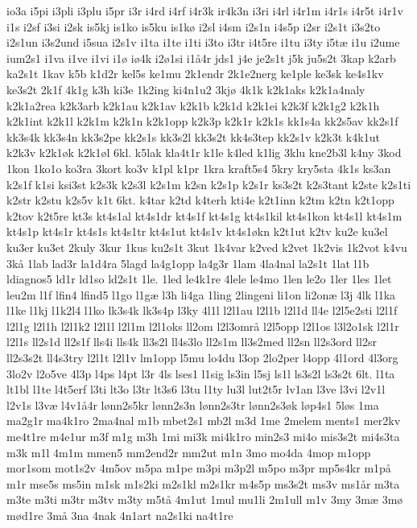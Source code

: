 {io3a
i5pi
i3pli
i3plu
i5pr
i3r
i4rd
i4rf
i4r3k
ir4k3n
i3ri
i4rl
i4r1m
i4r1s
i4r5t
i4r1v
i1s
i2sf
i3si
i2sk
is5kj
is1ko
is5ku
is1k^^f8
i2sl
i4sm
i2s1n
i4s5p
i2sr
i2s1t
i3s2to
i2s1un
i3s2und
i5sua
i2s1v
i1ta
i1te
i1ti
i3to
i3tr
i4t5re
i1tu
i3ty
i5t^^e6
i1u
i2ume
ium2s1
i1va
i1ve
i1vi
i1^^f8
i^^f84k
i2^^f81si
i1^^e54r
jds1
j4e
je2s1t
j5k
ju5s2t
3kap
k2arb
ka2s1t
1kav
k5b
k1d2r
kel5s
ke1mu
2k1endr
2k1e2nerg
ke1ple
ke3sk
ke4s1kv
ke3s2t
2k1f
4k1g
k3h
ki3e
1k2ing
ki4n1u2
3kj^^f8
4k1k
k2k1aks
k2k1a4naly
k2k1a2rea
k2k3arb
k2k1au
k2k1av
k2k1b
k2k1d
k2k1ei
k2k3f
k2k1g2
k2k1h
k2k1int
k2k1l
k2k1m
k2k1n
k2k1opp
k2k3p
k2k1r
k2k1s
kk1s4a
kk2s5av
kk2s1f
kk3s4k
kk3s4n
kk3s2pe
kk2s1s
kk3s2l
kk3s2t
kk4s3tep
kk2s1v
k2k3t
k4k1ut
k2k3v
k2k1^^f8k
k2k1^^f8l
6kl.
k5lak
kla4t1r
k1le
k4led
k1lig
3klu
kne2b3l
k4ny
3kod
1kon
1ko1o
ko3ra
3kort
ko3v
k1pl
k1pr
1kra
kraft5s4
5kry
kry5sta
4k1s
ks3an
k2s1f
k1si
ksi3st
k2s3k
k2s3l
k2s1m
k2sn
k2s1p
k2s1r
ks3s2t
k2s3tant
k2ste
k2s1ti
k2str
k2stu
k2s5v
k1t
6kt.
k4tar
k2td
k4terh
kti4e
k2t1inn
k2tm
k2tn
k2t1opp
k2tov
k2t5re
kt3s
kt4s1al
kt4s1dr
kt4s1f
kt4s1g
kt4s1kil
kt4s1kon
kt4s1l
kt4s1m
kt4s1p
kt4s1r
kt4s1s
kt4s1tr
kt4s1ut
kt4s1v
kt4s1^^f8kn
k2t1ut
k2tv
ku2e
ku3el
ku3er
ku3et
2kuly
3kur
1kus
ku2s1t
3kut
1k4var
k2ved
k2vet
1k2vis
1k2vot
k4vu
3k^^e5
1lab
lad3r
la1d4ra
5lagd
la4g1opp
la4g3r
1lam
4la4nal
la2s1t
1lat
l1b
ldiagnos5
ld1r
ld1so
ld2s1t
1le.
1led
le4k1re
4lele
le4mo
1len
le2o
1ler
1les
1let
leu2m
l1f
lfin4
lfind5
l1go
l1g^^e6
l3h
li4ga
1ling
2lingeni
li1on
li2on^^e6
l3j
4lk
l1ka
l1ke
l1kj
l1k2l4
l1ko
lk3s4k
lk3s4p
l3ky
4l1l
l2l1au
l2l1b
l2l1d
ll4e
l2l5e2sti
l2l1f
l2l1g
l2l1h
l2l1k2
l2l1l
l2l1m
l2l1oks
ll2om
l2l3omr^^e5
l2l5opp
l2l1os
l3l2o1sk
l2l1r
l2l1s
ll2s1d
ll2s1f
lls4i
lls4k
ll3s2l
ll4s3lo
ll2s1m
ll3s2med
ll2sn
ll2s3ord
ll2sr
ll2s3s2t
ll4s3try
l2l1t
l2l1v
lm1opp
l5mu
lo4du
l3op
2lo2per
l4opp
4l1ord
4l3org
3lo2v
l2o5ve
4l3p
l4ps
l4pt
l3r
4ls
lses1
l1sig
ls3in
l5sj
ls1l
ls3s2l
ls3s2t
6lt.
l1ta
lt1bl
l1te
l4t5erf
l3ti
lt3o
l3tr
lt3s6
l3tu
l1ty
lu3l
lut2t5r
lv1an
l3ve
l3vi
l2v1l
l2v1s
l3v^^e6
l4v1^^e54r
l^^f8nn2s5kr
l^^f8nn2s3n
l^^f8nn2s3tr
l^^f8nn2s3^^f8k
l^^f8p4s1
5l^^f8s
1ma
ma2g1r
ma4k1ro
2ma4nal
m1b
mbet2s1
mb2l
m3d
1me
2melem
ments1
mer2kv
me4t1re
m4e1ur
m3f
m1g
m3h
1mi
mi3k
mi4k1ro
min2s3
mi4o
mis3s2t
mi4s3ta
m3k
m1l
4m1m
mmen5
mm2end2r
mm2ut
m1n
3mo
mo4da
4mop
m1opp
mor1som
mot1s2v
4m5ov
m5pa
m1pe
m3pi
m3p2l
m5po
m3pr
mp5s4kr
m1p^^e5
m1r
mse5s
ms5in
m1sk
m1s2ki
m2s1kl
m2s1kr
m4s5p
ms3s2t
ms3v
ms1^^e5r
m3ta
m3te
m3ti
m3tr
m3tv
m3ty
m5t^^e5
4m1ut
1mul
mu1li
2m1ull
m1v
3my
3m^^e6
3m^^f8
m^^f8d1re
3m^^e5
3na
4nak
4n1art
na2s1ki
na4t1re
}
